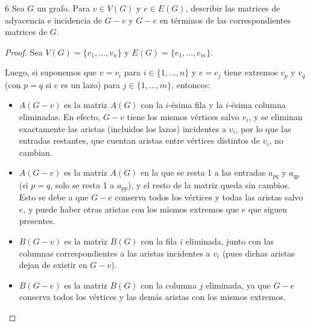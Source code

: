 \begin{ejercicioEntregar}{6}
    Sea \( G \) un grafo. Para \( v \in V(G) \) y \( e \in E(G) \), describir las matrices de adyacencia e incidencia de \( G-v \) y \( G-e \) en términos de las correspondientes matrices de \( G \).
\end{ejercicioEntregar}
\begin{proof}
    Sea \( V(G) = \{ v_1, \ldots, v_n \} \) y \( E(G) = \{ e_1, \ldots, e_m \} \).

    Luego, si suponemos que \( v = v_i \) para \( i \in \{ 1, \ldots, n \} \) y \( e = e_j \) tiene extremos \( v_p \) y \( v_q \) (con \( p = q \) si \( e \) es un lazo) para \( j \in \{ 1, \ldots, m \} \), entonces:
    \begin{itemize}
        \item \( A(G-v) \) es la matriz \( A(G) \) con la \( i \)-ésima fila y la \( i \)-ésima columna eliminadas. En efecto, \( G-v \) tiene los mismos vértices salvo \( v_i \), y se eliminan exactamente las aristas (incluidos los lazos) incidentes a \( v_i \), por lo que las entradas restantes, que cuentan aristas entre vértices distintos de \( v_i \), no cambian.
        \item \( A(G-e) \) es la matriz \( A(G) \) en la que se resta 1 a las entradas \( a_{pq} \) y \( a_{qp} \) (si \( p = q \), solo se resta 1 a \( a_{pp} \)), y el resto de la matriz queda sin cambios. Esto se debe a que \( G-e \) conserva todos los vértices y todas las aristas salvo \( e \), y puede haber otras aristas con los mismos extremos que \( e \) que siguen presentes.
        \item \( B(G-v) \) es la matriz \( B(G) \) con la fila \( i \) eliminada, junto con las columnas correspondientes a las aristas incidentes a \( v_i \) (pues dichas aristas dejan de existir en \( G - v \)).
        \item \( B(G-e) \) es la matriz \( B(G) \) con la columna \( j \) eliminada, ya que \( G-e \) conserva todos los vértices y las demás aristas con los mismos extremos.
    \end{itemize}
\end{proof}

\vspace{0.5cm}

